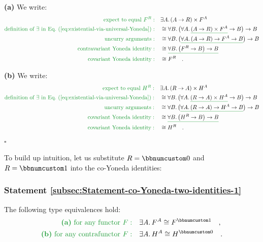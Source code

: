 \textbf{(a)} We write:
\begin{align*}
{\color{greenunder}\text{expect to equal }F^{R}:}\quad & \exists A.\,(A\rightarrow R)\times F^{A}\\
{\color{greenunder}\text{definition of }\exists\text{ in Eq.~}(\ref{eq:existential-via-universal-Yoneda}):}\quad & \cong\forall B.\,\big(\forall A.\,\gunderline{(A\rightarrow R)\times F^{A}}\rightarrow B\big)\rightarrow B\\
{\color{greenunder}\text{uncurry arguments}:}\quad & \cong\forall B.\,\big(\gunderline{\forall A.\,(A\rightarrow R)\rightarrow F^{A}\rightarrow B}\big)\rightarrow B\\
{\color{greenunder}\text{contravariant Yoneda identity}:}\quad & \cong\gunderline{\forall B.\,\big(F^{R}\rightarrow B\big)\rightarrow B}\\
{\color{greenunder}\text{covariant Yoneda identity}:}\quad & \cong F^{R}\quad.
\end{align*}

\textbf{(b)} We write:
\begin{align*}
{\color{greenunder}\text{expect to equal }H^{R}:}\quad & \exists A.\,(R\rightarrow A)\times H^{A}\\
{\color{greenunder}\text{definition of }\exists\text{ in Eq.~}(\ref{eq:existential-via-universal-Yoneda}):}\quad & \cong\forall B.\,\big(\forall A.\,\gunderline{(R\rightarrow A)\times H^{A}}\rightarrow B\big)\rightarrow B\\
{\color{greenunder}\text{uncurry arguments}:}\quad & \cong\forall B.\,\big(\gunderline{\forall A.\,(R\rightarrow A)\rightarrow H^{A}\rightarrow B}\big)\rightarrow B\\
{\color{greenunder}\text{covariant Yoneda identity}:}\quad & \cong\gunderline{\forall B.\,\big(H^{R}\rightarrow B\big)\rightarrow B}\\
{\color{greenunder}\text{covariant Yoneda identity}:}\quad & \cong H^{R}\quad.
\end{align*}
$\square$

To build up intuition, let us substitute $R=\bbnum 0$ and $R=\bbnum 1$
into the co-Yoneda identities:

\subsubsection{Statement \label{subsec:Statement-co-Yoneda-two-identities-1}\ref{subsec:Statement-co-Yoneda-two-identities-1}}

The following type equivalences hold:
\begin{align*}
{\color{greenunder}\text{\textbf{(a)} for any functor }F:}\quad & \exists A.\,F^{A}\cong F^{\bbnum 1}\quad,\\
{\color{greenunder}\text{\textbf{(b)} for any contrafunctor }F:}\quad & \exists A.\,H^{A}\cong H^{\bbnum 0}\quad.
\end{align*}


